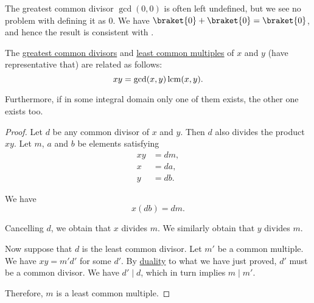 \begin{remark}\label{rem:gcd_of_zeros}
  The greatest common divisor \( \gcd(0, 0) \) is often left undefined, but we see no problem with defining it as \( 0 \). We have \( \braket{ 0 } + \braket{ 0 } = \braket{ 0 } \), and hence the result is consistent with .
\end{remark}

\begin{proposition}\label{thm:gcd_and_lcm}
  The \hyperref[def:gcd_and_lcm]{greatest common divisors} and \hyperref[def:gcd_and_lcm]{least common multiples} of \( x \) and \( y \) (have representative that) are related as follows:
  \begin{equation}\label{eq:thm:gcd_and_lcm}
    xy = \gcd(x, y) \operatorname{lcm}(x, y).
  \end{equation}

  Furthermore, if in some integral domain only one of them exists, the other one exists too.
\end{proposition}
\begin{proof}
  Let \( d \) be any common divisor of \( x \) and \( y \). Then \( d \) also divides the product \( xy \). Let \( m \), \( a \) and \( b \) be elements satisfying
  \begin{align*}
    xy &= d m, \\
     x &= d a, \\
     y &= d b.
  \end{align*}

  We have
  \begin{equation*}
    x (db) = d m.
  \end{equation*}

  Cancelling \( d \), we obtain that \( x \) divides \( m \). We similarly obtain that \( y \) divides \( m \).

  Now suppose that \( d \) is the least common divisor. Let \( m' \) be a common multiple. We have \( xy = m' d' \) for some \( d' \). By \hyperref[thm:preorder_duality]{duality} to what we have just proved, \( d' \) must be a common divisor. We have \( d' \mid d \), which in turn implies \( m \mid m' \).

  Therefore, \( m \) is a least common multiple.
\end{proof}

